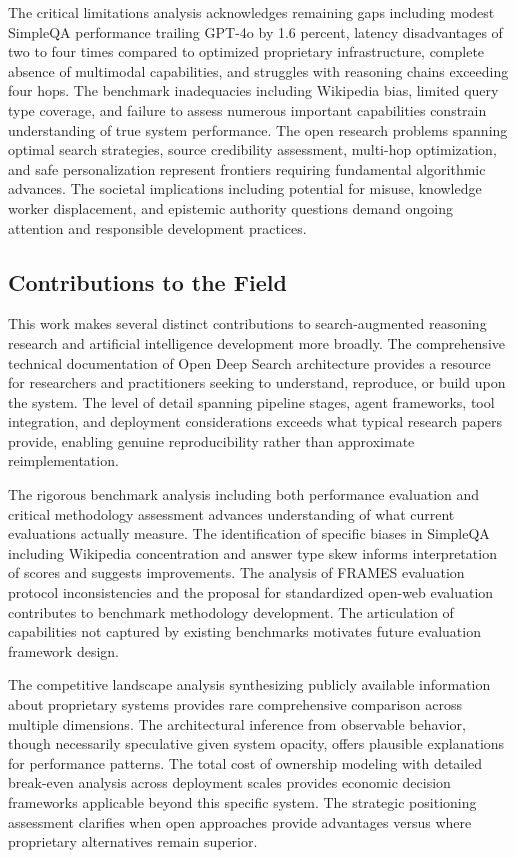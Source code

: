 The critical limitations analysis acknowledges remaining gaps including modest SimpleQA performance trailing GPT-4o by 1.6 percent, latency disadvantages of two to four times compared to optimized proprietary infrastructure, complete absence of multimodal capabilities, and struggles with reasoning chains exceeding four hops. The benchmark inadequacies including Wikipedia bias, limited query type coverage, and failure to assess numerous important capabilities constrain understanding of true system performance. The open research problems spanning optimal search strategies, source credibility assessment, multi-hop optimization, and safe personalization represent frontiers requiring fundamental algorithmic advances. The societal implications including potential for misuse, knowledge worker displacement, and epistemic authority questions demand ongoing attention and responsible development practices.

\subsection{Contributions to the Field}

This work makes several distinct contributions to search-augmented reasoning research and artificial intelligence development more broadly. The comprehensive technical documentation of Open Deep Search architecture provides a resource for researchers and practitioners seeking to understand, reproduce, or build upon the system. The level of detail spanning pipeline stages, agent frameworks, tool integration, and deployment considerations exceeds what typical research papers provide, enabling genuine reproducibility rather than approximate reimplementation.

The rigorous benchmark analysis including both performance evaluation and critical methodology assessment advances understanding of what current evaluations actually measure. The identification of specific biases in SimpleQA including Wikipedia concentration and answer type skew informs interpretation of scores and suggests improvements. The analysis of FRAMES evaluation protocol inconsistencies and the proposal for standardized open-web evaluation contributes to benchmark methodology development. The articulation of capabilities not captured by existing benchmarks motivates future evaluation framework design.

The competitive landscape analysis synthesizing publicly available information about proprietary systems provides rare comprehensive comparison across multiple dimensions. The architectural inference from observable behavior, though necessarily speculative given system opacity, offers plausible explanations for performance patterns. The total cost of ownership modeling with detailed break-even analysis across deployment scales provides economic decision frameworks applicable beyond this specific system. The strategic positioning assessment clarifies when open approaches provide advantages versus where proprietary alternatives remain superior.

